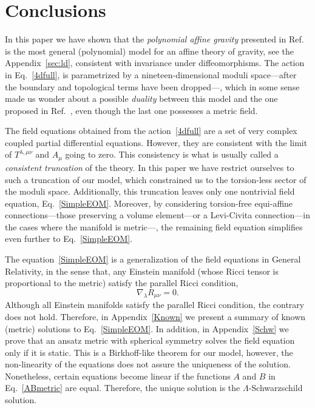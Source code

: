 \documentclass[aps,prd,12pt,twocolumn,superscriptaddress,showpacs,showkeys,reprint%
]{revtex4-1}
\newcommand\nab[1]{\nabla_{{#1}}}
\renewcommand{\(}{\left(}
\renewcommand{\)}{\right)}
\renewcommand{\[}{\left[}
\renewcommand{\]}{\right]}
\begin{document}
\section{\label{conclusions}Conclusions}

In this paper we have shown that the \emph{polynomial affine gravity} presented in Ref.~\cite{Skirzewski:2014eta} is the most general (polynomial) model for an affine theory of gravity, see the Appendix~\ref{sec:ld}, consistent with invariance under diffeomorphisms. The action in Eq.~\eqref{4dfull}, is parametrized by a nineteen-dimensional moduli space---after the boundary and topological terms have been dropped---, which in some sense made us wonder about a possible \emph{duality} between this model and the one proposed in Ref.~\cite{Pagani:2015ema}, even though the last one possesses a metric field.

The field equations obtained from the action~\eqref{4dfull} are a set of very complex coupled partial differential equations. However, they are consistent with the limit of $T^{\lambda,\mu\nu}$ and $A_\mu$ going to zero. This consistency is what is usually called a \emph{consistent truncation} of the theory. In this paper we have restrict ourselves to such a truncation of our model, which constrained us to the torsion-less sector of the moduli space. Additionally, this truncation leaves only one nontrivial field equation, Eq.~\eqref{SimpleEOM}.
Moreover, by considering torsion-free equi-affine connections---those preserving a volume element---or a Levi-Civita connection---in the cases where the manifold is metric---, the remaining field equation simplifies even further to Eq.~\eqref{SimpleEOM}.

The equation~\eqref{SimpleEOM} is a generalization of the field equations in General Relativity, in the sense that, any Einstein manifold (whose Ricci tensor is proportional to the metric) satisfy the parallel Ricci condition,
\begin{equation}
  \nab{\lambda} R_{\mu\nu} = 0.
\end{equation}
Although all Einstein manifolds satisfy the parallel Ricci condition, the contrary does not hold. Therefore, in Appendix~\ref{Known} we present a summary of known (metric) solutions to Eq.~\eqref{SimpleEOM}. In addition, in Appendix~\ref{Schw} we prove that an ansatz metric with spherical symmetry solves the field equation only if it is static. This is a Birkhoff-like theorem for our model, however, the non-linearity of the equations does not assure the uniqueness of the solution. Nonetheless, certain equations become linear if the functions $A$ and $B$ in Eq.~\eqref{ABmetric} are equal. Therefore, the unique solution is the $\Lambda$-Schwarzschild solution.
\end{document}
